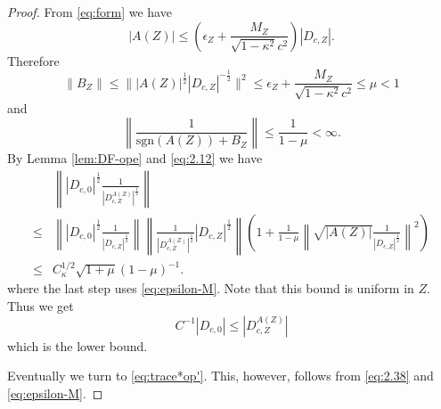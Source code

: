 \documentclass[a4paper]{amsart}
\def\sgn{\mathrm{sgn}} %
\begin{document}
\begin{proof}
From \eqref{eq:form} we have
\begin{equation}
  \label{eq:2.38}
    |A(Z)|\leq \left(\epsilon_Z +\frac{M_Z}{\sqrt{1-\kappa^2} c^2} \right)|D_{c,Z}|. 
\end{equation}
Therefore
\begin{equation}
  \|B_Z\|\leq \||A(Z)|^{\frac12}|D_{c,Z}|^{-\frac12}\|^2\leq \epsilon_Z +\frac{M_Z}{\sqrt{1-\kappa^2} c^2} \leq\mu<1
\end{equation}
and
\begin{equation}
    \left\| \frac{1}{\sgn(A(Z))+B_Z}\right\|\leq \frac{1}{1-\mu}<\infty.
\end{equation}
By Lemma \ref{lem:DF-ope} and \eqref{eq:2.12} we have 
\begin{equation}
  \begin{split}
  &\left\||D_{c,0}|^{\frac12}{\frac{1}{|D_{c,Z}^{A(Z)}|^{\frac12}}}\right\|\\
  \leq&\left\| |D_{c,0}|^{\frac12}{\frac{1}{|D_{c,Z}|^{\frac12}} } \right\|
   \left\|{\frac{1}{|D_{c,Z}^{A(Z)}|^{\frac12}}}|D_{c,Z}|^{\frac12}\right\|
  \left(1+  \frac{1}{1- \mu} \left\|\sqrt{|A(Z)|} {\frac{1}{|D_{c,Z}|^{\frac12}}}\right\|^2\right)\\
   \leq & C_\kappa^{1/2} \sqrt{1+\mu} \left(1- \mu\right)^{-1}.
  \end{split}
\end{equation}
where the last step uses \eqref{eq:epsilon-M}. Note that this bound is
uniform in $Z$.  Thus we get
\begin{equation}
   C^{-1} |D_{c,0}|\leq |D_{c,Z}^{A(Z)}|
\end{equation}
which is the lower bound.

Eventually we turn to \eqref{eq:trace*op'}. This, however, follows from
\eqref{eq:2.38} and \eqref{eq:epsilon-M}.
\end{proof}
\end{document}
